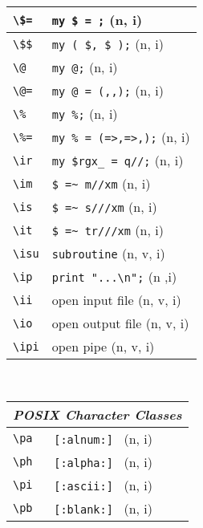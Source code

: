 \documentclass[oneside,10pt,landscape,DIV16]{scrartcl}
\begin{document}
\begin{multicols}{3}
\begin{center}
\begin{tabular}[]{|p{11mm}|p{58mm}|}
\hline \verb'\$='  & \verb'my $ = ;'           \hfill (n, i)\\
\hline \verb'\$$'  & \verb'my ( $, $ );'       \hfill (n, i)\\
\hline \verb'\@'   & \verb'my @;'              \hfill (n, i)\\
\hline \verb'\@='  & \verb'my @ = (,,);'       \hfill (n, i)\\
\hline \verb'\%'   & \verb'my %;'              \hfill (n, i)\\
\hline \verb'\%='  & \verb'my % = (=>,=>,);'   \hfill (n, i)\\
\hline \verb'\ir'  & \verb'my $rgx_ = q//;'    \hfill (n, i)\\
\hline \verb'\im'  & \verb'$ =~ m//xm'         \hfill (n, i)\\
\hline \verb'\is'  & \verb'$ =~ s///xm'        \hfill (n, i)\\
\hline \verb'\it'  & \verb'$ =~ tr///xm'       \hfill (n, i)\\
\hline \verb'\isu' & \verb'subroutine'         \hfill (n, v, i)\\
\hline \verb'\ip'  & \verb'print "...\n";'     \hfill (n ,i)\\
\hline \verb'\ii'  & open input file           \hfill (n, v, i)\\
\hline \verb'\io'  & open output file          \hfill (n, v, i)\\
\hline \verb'\ipi' & open pipe                 \hfill (n, v, i)\\
\hline
\end{tabular}\\
%
%
\begin{tabular}[]{|p{11mm}|p{58mm}|}
\hline
\multicolumn{2}{|r|}{\textsl{\textbf{P}OSIX Character Classes}} \\
\hline \verb'\pa' &  \verb'[:alnum:] '         \hfill (n, i)\\
\hline \verb'\ph' &  \verb'[:alpha:] '         \hfill (n, i)\\
\hline \verb'\pi' &  \verb'[:ascii:] '         \hfill (n, i)\\
\hline \verb'\pb' &  \verb'[:blank:] '         \hfill (n, i)\\

\end{tabular}
\end{center}
\end{multicols}
\end{document}
